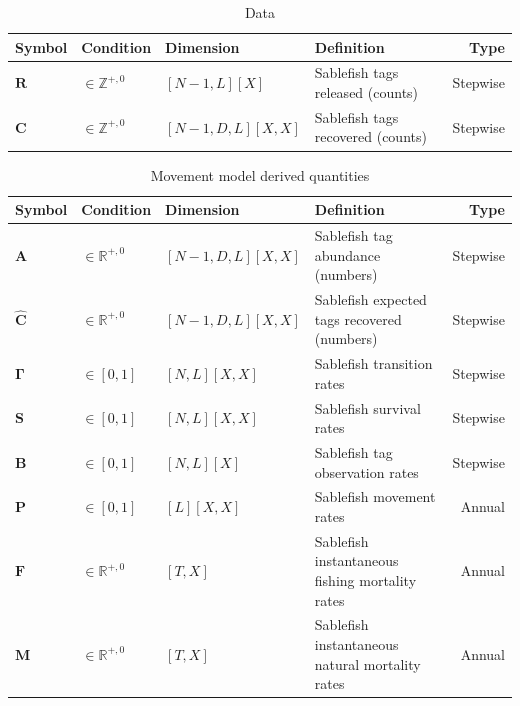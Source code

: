 \documentclass{article}
\begin{document}
\begin{table}[ht]
  \centering
  \caption{Data}
  \renewcommand\arraystretch{1.2}
  \label{tab:data}
  \begin{tabular}{l l l l r}
    \toprule
    \textbf{Symbol} & \textbf{Condition} & \textbf{Dimension} & \textbf{Definition} & \textbf{Type} \\
    \toprule
    $\bm{R}$ & $\in \mathbb{Z}^{+,0}$ & $[N\!-\!1, L][X]$ & Sablefish tags released (counts) & Stepwise \\
    $\bm{C}$ & $\in \mathbb{Z}^{+,0}$ & $[N\!-\!1, D, L][X, X]$ & Sablefish tags recovered (counts) & Stepwise \\
    \bottomrule
  \end{tabular}
\end{table}

\begin{table}[ht]
  \centering
  \caption{Movement model derived quantities}
  \renewcommand\arraystretch{1.2}
  \label{tab:model-derived}
  \begin{tabular}{l l l l r}
    \toprule
    \textbf{Symbol} & \textbf{Condition} & \textbf{Dimension} & \textbf{Definition} & \textbf{Type} \\
    \toprule
    $\bm{A}$ & $\in \mathbb{R}^{+,0}$ & $[N\!-\!1, D, L][X, X]$ & Sablefish tag abundance (numbers) & Stepwise \\
    $\boldsymbol{\widehat{C}}$ & $\in \mathbb{R}^{+,0}$ & $[N\!-\!1, D, L][X, X]$ & Sablefish expected tags recovered (numbers) & Stepwise \\
    $\boldsymbol{\Gamma}$ & $\in \left[0, 1 \right]$ & $[N, L][X, X]$ & Sablefish transition rates & Stepwise \\
    $\bm{S}$ & $\in \left[0, 1 \right]$ & $[N, L][X, X]$ & Sablefish survival rates & Stepwise \\
    $\bm{B}$ & $\in \left[0, 1 \right]$ & $[N, L][X]$ & Sablefish tag observation rates & Stepwise \\
    \midrule
    $\bm{P}$ & $\in \left[0, 1 \right]$ & $[L][X, X]$ & Sablefish movement rates & Annual \\
    $\bm{F}$ & $\in \mathbb{R}^{+,0}$ & $[T, X]$ & Sablefish instantaneous fishing mortality rates & Annual \\
    $\bm{M}$ & $\in \mathbb{R}^{+,0}$ & $[T, X]$ & Sablefish instantaneous natural mortality rates & Annual \\
    \bottomrule
  \end{tabular}
\end{table}
\end{document}
